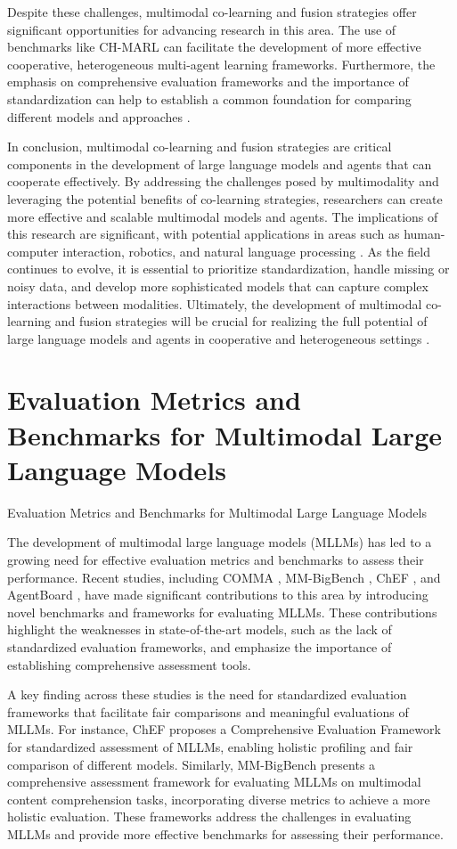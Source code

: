 \documentclass[conference]{IEEEtran}
\begin{document}
Despite these challenges, multimodal co-learning and fusion strategies offer significant opportunities for advancing research in this area. The use of benchmarks like CH-MARL \cite{b9} can facilitate the development of more effective cooperative, heterogeneous multi-agent learning frameworks. Furthermore, the emphasis on comprehensive evaluation frameworks and the importance of standardization can help to establish a common foundation for comparing different models and approaches \cite{b10}.

In conclusion, multimodal co-learning and fusion strategies are critical components in the development of large language models and agents that can cooperate effectively. By addressing the challenges posed by multimodality and leveraging the potential benefits of co-learning strategies, researchers can create more effective and scalable multimodal models and agents. The implications of this research are significant, with potential applications in areas such as human-computer interaction, robotics, and natural language processing \cite{b11}. As the field continues to evolve, it is essential to prioritize standardization, handle missing or noisy data, and develop more sophisticated models that can capture complex interactions between modalities. Ultimately, the development of multimodal co-learning and fusion strategies will be crucial for realizing the full potential of large language models and agents in cooperative and heterogeneous settings \cite{b12}.

\section{Evaluation Metrics and Benchmarks for Multimodal Large Language Models}
Evaluation Metrics and Benchmarks for Multimodal Large Language Models

The development of multimodal large language models (MLLMs) has led to a growing need for effective evaluation metrics and benchmarks to assess their performance. Recent studies, including COMMA \cite{b1}, MM-BigBench \cite{b2}, ChEF \cite{b3}, and AgentBoard \cite{b4}, have made significant contributions to this area by introducing novel benchmarks and frameworks for evaluating MLLMs. These contributions highlight the weaknesses in state-of-the-art models, such as the lack of standardized evaluation frameworks, and emphasize the importance of establishing comprehensive assessment tools.

A key finding across these studies is the need for standardized evaluation frameworks that facilitate fair comparisons and meaningful evaluations of MLLMs. For instance, ChEF \cite{b3} proposes a Comprehensive Evaluation Framework for standardized assessment of MLLMs, enabling holistic profiling and fair comparison of different models. Similarly, MM-BigBench \cite{b2} presents a comprehensive assessment framework for evaluating MLLMs on multimodal content comprehension tasks, incorporating diverse metrics to achieve a more holistic evaluation. These frameworks address the challenges in evaluating MLLMs and provide more effective benchmarks for assessing their performance.
\end{document}

